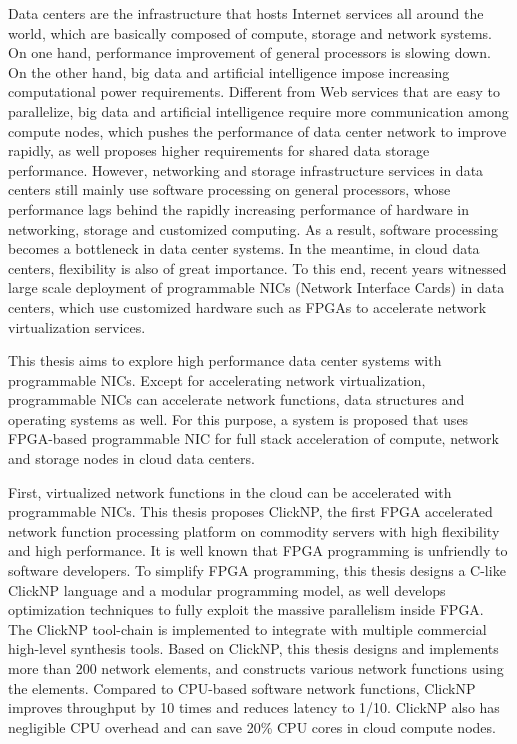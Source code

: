 \begin{enabstract}
	
Data centers are the infrastructure that hosts Internet services all around the world, which are basically composed of compute, storage and network systems.
On one hand, performance improvement of general processors is slowing down.
On the other hand, big data and artificial intelligence impose increasing computational power requirements.
Different from Web services that are easy to parallelize, big data and artificial intelligence require more communication among compute nodes, which pushes the performance of data center network to improve rapidly, as well proposes higher requirements for shared data storage performance.
However, networking and storage infrastructure services in data centers still mainly use software processing on general processors, whose performance lags behind the rapidly increasing performance of hardware in networking, storage and customized computing.
As a result, software processing becomes a bottleneck in data center systems.
In the meantime, in cloud data centers, flexibility is also of great importance.
To this end, recent years witnessed large scale deployment of programmable NICs (Network Interface Cards) in data centers, which use customized hardware such as FPGAs to accelerate network virtualization services.

This thesis aims to explore high performance data center systems with programmable NICs.
Except for accelerating network virtualization, programmable NICs can accelerate network functions, data structures and operating systems as well.
For this purpose, a system is proposed that uses FPGA-based programmable NIC for full stack acceleration of compute, network and storage nodes in cloud data centers.

First, virtualized network functions in the cloud can be accelerated with programmable NICs. This thesis proposes ClickNP, the first FPGA accelerated network function processing platform on commodity servers with high flexibility and high performance.
It is well known that FPGA programming is unfriendly to software developers.
To simplify FPGA programming, this thesis designs a C-like ClickNP language and a modular programming model, as well develops optimization techniques to fully exploit the massive parallelism inside FPGA.
The ClickNP tool-chain is implemented to integrate with multiple commercial high-level synthesis tools.
Based on ClickNP, this thesis designs and implements more than 200 network elements, and constructs various network functions using the elements.
Compared to CPU-based software network functions, ClickNP improves throughput by 10 times and reduces latency to 1/10.
ClickNP also has negligible CPU overhead and can save 20\% CPU cores in cloud compute nodes.


\end{enabstract}
